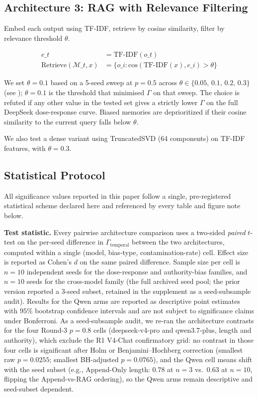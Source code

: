 \documentclass[11pt]{article}
\begin{document}
\subsection{Architecture 3: RAG with Relevance Filtering}

Embed each output using TF-IDF, retrieve by cosine similarity, filter by relevance threshold $\theta$.

\begin{align}
e\_t &= \text{TF-IDF}(o\_t) \\
\text{Retrieve}(\mathcal{M}\_t, x) &= \{o\_i : \text{cos}(\text{TF-IDF}(x), e\_i) > \theta\}
\end{align}

We set $\theta = 0.1$ based on a 5-seed sweep at $p=0.5$ across $\theta \in \{0.05,\,0.1,\,0.2,\,0.3\}$ (see ); $\theta = 0.1$ is the threshold that minimised $\Gamma$ on that sweep. The choice is refuted if any other value in the tested set gives a strictly lower $\Gamma$ on the full DeepSeek dose-response curve. Biased memories are deprioritized if their cosine similarity to the current query falls below $\theta$.

We also test a dense variant using TruncatedSVD (64 components) on TF-IDF features, with $\theta = 0.3$.


\subsection{Statistical Protocol}
\label{sec:stat-protocol}

All significance values reported in this paper follow a single, pre-registered statistical scheme declared here and referenced by every table and figure note below.

\textbf{Test statistic.} Every pairwise architecture comparison uses a two-sided \emph{paired} $t$-test on the per-seed difference in $\Gamma_{\text{temporal}}$ between the two architectures, computed within a single (model, bias-type, contamination-rate) cell. Effect size is reported as Cohen's $d$ on the same paired difference. Sample size per cell is $n=10$ independent seeds for the dose-response and authority-bias families, and $n=10$ seeds for the cross-model family (the full archived seed pool; the prior version reported a $3$-seed subset, retained in the supplement as a seed-subsample audit). Results for the Qwen arms are reported as descriptive point estimates with $95\%$ bootstrap confidence intervals and are not subject to significance claims under Bonferroni. As a seed-subsample audit, we re-ran the architecture contrasts for the four Round-3 $p{=}0.8$ cells (deepseek-v4-pro and qwen3.7-plus, length and authority), which exclude the R1 V4-Chat confirmatory grid: no contrast in those four cells is significant after Holm or Benjamini--Hochberg correction (smallest raw $p = 0.0255$; smallest BH-adjusted $p = 0.0765$), and the Qwen cell means shift with the seed subset (e.g., Append-Only length: $0.78$ at $n{=}3$ vs.\ $0.63$ at $n{=}10$, flipping the Append-vs-RAG ordering), so the Qwen arms remain descriptive and seed-subset dependent.
\end{document}
